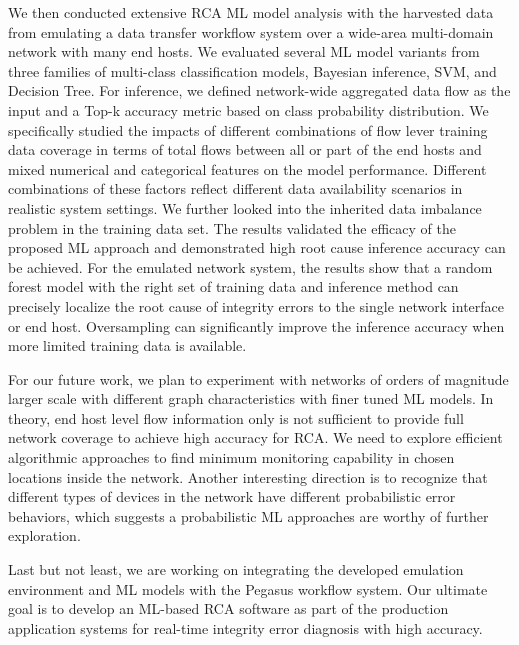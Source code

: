We then conducted extensive RCA ML model analysis with the harvested data from emulating a data transfer workflow system over a wide-area multi-domain network with many end hosts. We evaluated several ML model variants from three families of multi-class classification models, Bayesian inference, SVM, and Decision Tree. For inference, we defined network-wide aggregated data flow as the input and a Top-k accuracy metric based on class probability distribution. We specifically studied the impacts of different combinations of flow lever training data coverage in terms of total flows between all or part of the end hosts and mixed numerical and categorical features on the model performance. Different combinations of these factors reflect different data availability scenarios in realistic system settings. We further looked into the inherited data imbalance problem in the training data set. The results validated the efficacy of the proposed ML approach and demonstrated high root cause inference accuracy can be achieved. For the emulated network system, the results show that a random forest model with the right set of training data and inference method can precisely localize the root cause of integrity errors to the single network interface or end host. Oversampling can significantly improve the inference accuracy when more limited training data is available. 

For our future work, we plan to experiment with networks of orders of magnitude larger scale with different graph characteristics with finer tuned ML models. In theory, end host level flow information only is not sufficient to provide full network coverage to achieve high accuracy for RCA. We need to explore efficient algorithmic approaches to find minimum monitoring capability in chosen locations inside the network. Another interesting direction is to recognize that different types of devices in the network have different probabilistic error behaviors, which suggests a probabilistic ML approaches are worthy of further exploration.

Last but not least, we are working on integrating the developed emulation environment and ML models with the Pegasus workflow system. Our ultimate goal is to develop an ML-based RCA software as part of the production application systems for real-time integrity error diagnosis with high accuracy.

